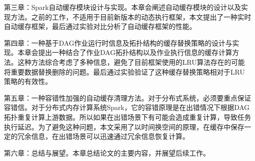 第三章：Spark自动缓存模块设计与实现。本章会阐述自动缓存模块的设计以及实现方法。之前的工作，不适用于目前新版本的动态执行框架，本文提出了一种实时自动缓存框架，最后通过实验对比分析了自动缓存框架的性能。

第四章：一种基于DAG作业运行时信息及拓扑结构的缓存替换策略的设计与实现。本章会提出一种结合了作业DAG拓扑结构以及作业执行信息的缓存计算方法。这种方法综合考虑了多种信息，避免了目前框架使用的LRU算法存在的可能将重要数据替换删除的问题。最后通过实验验证了这种缓存替换策略相对于LRU策略的有效性。

第五章：一种容错性加强的自动缓存清理方法。对于分布式系统，必须要重点保证容错信。对于分布式内存计算系统Spark，它的容错原理是在出错情况下根据DAG拓扑重复计算上游数据。所以如果在出错场景下有可能会造成重复计算，导致任务执行延迟。为了避免这种问题，本文采用了以时间换空间的原理，在缓存中保存一定的冗余信息，在出错场景可以迅速通过冗余信息恢复计算。

第六章：总结与展望。本章总结论文的主要内容，并展望后续工作。
